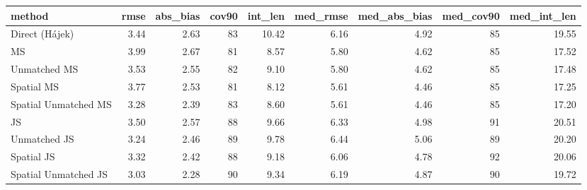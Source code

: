 
\begin{tabular}{lrrrrrrrr}
\toprule
method & rmse & abs\_bias & cov90 & int\_len & med\_rmse & med\_abs\_bias & med\_cov90 & med\_int\_len\\
\midrule
Direct (Hájek) & 3.44 & 2.63 & 83 & 10.42 & 6.16 & 4.92 & 85 & 19.55\\
MS & 3.99 & 2.67 & 81 & 8.57 & 5.80 & 4.62 & 85 & 17.52\\
Unmatched MS & 3.53 & 2.55 & 82 & 9.10 & 5.80 & 4.62 & 85 & 17.48\\
Spatial MS & 3.77 & 2.53 & 81 & 8.12 & 5.61 & 4.46 & 85 & 17.25\\
Spatial Unmatched MS & 3.28 & 2.39 & 83 & 8.60 & 5.61 & 4.46 & 85 & 17.20\\
JS & 3.50 & 2.57 & 88 & 9.66 & 6.33 & 4.98 & 91 & 20.51\\
Unmatched JS & 3.24 & 2.46 & 89 & 9.78 & 6.44 & 5.06 & 89 & 20.20\\
Spatial JS & 3.32 & 2.42 & 88 & 9.18 & 6.06 & 4.78 & 92 & 20.06\\
Spatial Unmatched JS & 3.03 & 2.28 & 90 & 9.34 & 6.19 & 4.87 & 90 & 19.72\\
\bottomrule
\end{tabular}
